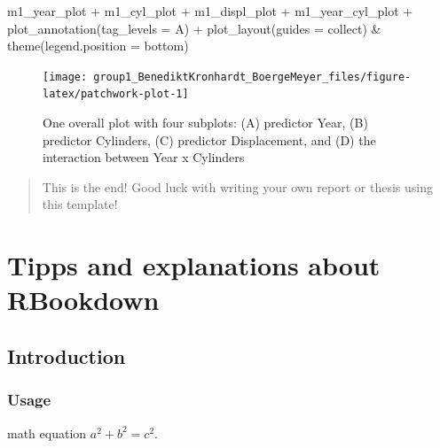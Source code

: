 \documentclass[
  11pt,
  a4paper,
  twoside]{scrbook}
\newenvironment{Shaded}{\begin{snugshade}}{\end{snugshade}}
\newcommand{\AttributeTok}[1]{\textcolor[rgb]{0.77,0.63,0.00}{#1}}
\newcommand{\FunctionTok}[1]{\textcolor[rgb]{0.00,0.00,0.00}{#1}}
\newcommand{\NormalTok}[1]{#1}
\newcommand{\SpecialCharTok}[1]{\textcolor[rgb]{0.00,0.00,0.00}{#1}}
\newcommand{\StringTok}[1]{\textcolor[rgb]{0.31,0.60,0.02}{#1}}
\begin{document}
\begin{Shaded}
\begin{Highlighting}[]
\NormalTok{m1\_year\_plot }\SpecialCharTok{+}\NormalTok{ m1\_cyl\_plot }\SpecialCharTok{+}\NormalTok{ m1\_displ\_plot }\SpecialCharTok{+}\NormalTok{ m1\_year\_cyl\_plot }\SpecialCharTok{+}
    \FunctionTok{plot\_annotation}\NormalTok{(}\AttributeTok{tag\_levels =} \StringTok{\textquotesingle{}A\textquotesingle{}}\NormalTok{) }\SpecialCharTok{+}
    \FunctionTok{plot\_layout}\NormalTok{(}\AttributeTok{guides =} \StringTok{\textquotesingle{}collect\textquotesingle{}}\NormalTok{) }\SpecialCharTok{\&}
    \FunctionTok{theme}\NormalTok{(}\AttributeTok{legend.position =} \StringTok{\textquotesingle{}bottom\textquotesingle{}}\NormalTok{)}
\end{Highlighting}
\end{Shaded}

\linespread{1}

\begin{figure}[H]

{\centering \texttt{[image: group1\_BenediktKronhardt\_BoergeMeyer\_files/figure-latex/patchwork-plot-1]} 

}

\caption[One overall plot with four subplots]{One overall plot with four subplots: (A) predictor Year, (B) predictor Cylinders, (C) predictor Displacement, and (D) the interaction between Year x Cylinders}\label{fig:patchwork-plot}
\end{figure}

\begin{quote}
This is the end! Good luck with writing your own report or thesis using this template!
\end{quote}

\hypertarget{tipps-and-explanations-about-rbookdown}{%
\chapter{Tipps and explanations about RBookdown}\label{tipps-and-explanations-about-rbookdown}}

\hypertarget{introduction-1}{%
\section{Introduction}\label{introduction-1}}

\hypertarget{usage}{%
\subsection{Usage}\label{usage}}

math equation \(a^2 + b^2 = c^2\).
\end{document}
